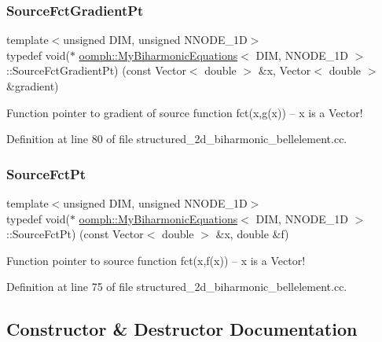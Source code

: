 \subsubsection{\texorpdfstring{Source\+Fct\+Gradient\+Pt}{SourceFctGradientPt}}
{\footnotesize\ttfamily template$<$unsigned D\+IM, unsigned N\+N\+O\+D\+E\+\_\+1D$>$ \\
typedef void($\ast$ \hyperlink{classoomph_1_1MyBiharmonicEquations}{oomph\+::\+My\+Biharmonic\+Equations}$<$ D\+IM, N\+N\+O\+D\+E\+\_\+1D $>$\+::Source\+Fct\+Gradient\+Pt) (const Vector$<$ double $>$ \&x, Vector$<$ double $>$ \&gradient)}



Function pointer to gradient of source function fct(x,g(x)) -- x is a Vector! 



Definition at line 80 of file structured\+\_\+2d\+\_\+biharmonic\+\_\+bellelement.\+cc.

\mbox{\label{classoomph_1_1MyBiharmonicEquations_a17bd58054c66229016eb1c52eab36bc1}} 
\subsubsection{\texorpdfstring{Source\+Fct\+Pt}{SourceFctPt}}
{\footnotesize\ttfamily template$<$unsigned D\+IM, unsigned N\+N\+O\+D\+E\+\_\+1D$>$ \\
typedef void($\ast$ \hyperlink{classoomph_1_1MyBiharmonicEquations}{oomph\+::\+My\+Biharmonic\+Equations}$<$ D\+IM, N\+N\+O\+D\+E\+\_\+1D $>$\+::Source\+Fct\+Pt) (const Vector$<$ double $>$ \&x, double \&f)}



Function pointer to source function fct(x,f(x)) -- x is a Vector! 



Definition at line 75 of file structured\+\_\+2d\+\_\+biharmonic\+\_\+bellelement.\+cc.



\subsection{Constructor \& Destructor Documentation}
\mbox{\label{classoomph_1_1MyBiharmonicEquations_ab5084decf9d75cee91f0e88fb4f62c86}} 
